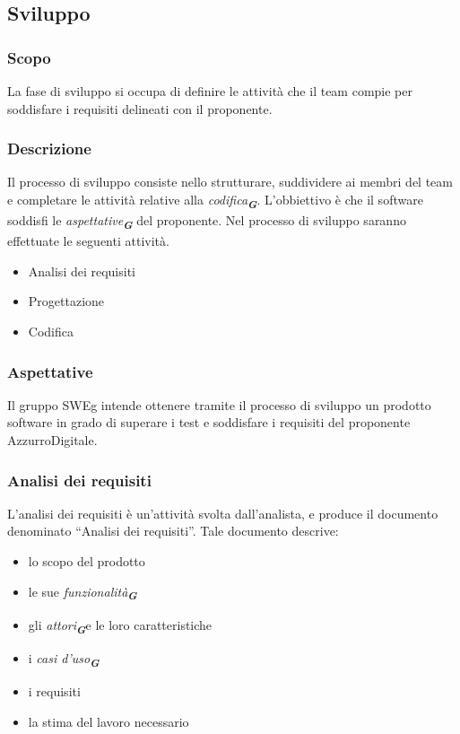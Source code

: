 \subsection{Sviluppo}
\subsubsection{Scopo}
La fase di sviluppo si occupa di definire le attività che il team compie per soddisfare i requisiti delineati con il proponente.

\subsubsection{Descrizione}
Il processo di sviluppo consiste nello strutturare, suddividere ai membri del team e completare le attività relative alla \emph{codifica}\textsubscript{\textit{\textbf{G}}}. L’obbiettivo è che il software soddisfi le \emph{aspettative}\textsubscript{\textit{\textbf{G}}} del proponente.
Nel processo di sviluppo saranno effettuate le seguenti attività.
\begin{itemize}
\item Analisi dei requisiti
\item Progettazione
\item Codifica
\end{itemize}

\subsubsection{Aspettative}
Il gruppo SWEg intende ottenere tramite il processo di sviluppo un prodotto software in grado di superare i test e soddisfare i requisiti del proponente AzzurroDigitale.

\subsubsection{Analisi dei requisiti}

L’analisi dei requisiti è un’attività svolta dall’analista, e produce il documento denominato “Analisi dei requisiti”. 
Tale documento descrive:
\begin{itemize}
\item lo scopo del prodotto
\item le sue \emph{funzionalità}\textsubscript{\textit{\textbf{G}}}
\item gli \emph{attori}\textsubscript{\textit{\textbf{G}}}e le loro caratteristiche
\item i \emph{casi d'uso}\textsubscript{\textit{\textbf{G}}}
\item i requisiti
\item la stima del lavoro necessario
\end{itemize}

